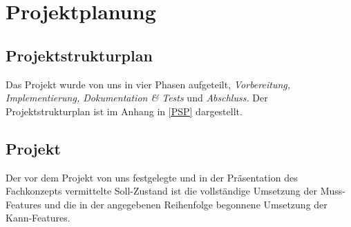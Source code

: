 

\section{Projektplanung}

\subsection{Projektstrukturplan}
Das Projekt wurde von uns in vier Phasen aufgeteilt, \textit{Vorbereitung, Implementierung, Dokumentation \& Tests} und \textit{Abschluss.}
Der Projektstrukturplan ist im Anhang in \cref{PSP} dargestellt.

\subsection{Projekt}
Der vor dem Projekt von uns festgelegte und in der Präsentation des Fachkonzepts vermittelte Soll-Zustand ist die vollständige Umsetzung der Muss-Features und die in der angegebenen Reihenfolge begonnene Umsetzung der Kann-Features.

